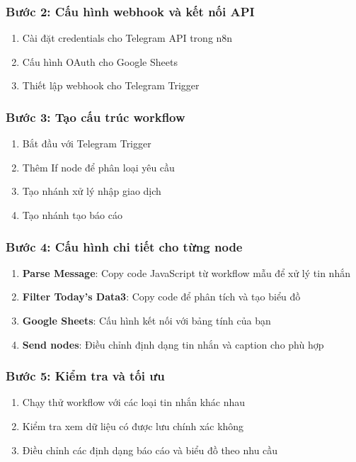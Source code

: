 \subsubsection{Bước 2: Cấu hình webhook và kết nối API}
\begin{enumerate}
    \item Cài đặt credentials cho Telegram API trong n8n
    \item Cấu hình OAuth cho Google Sheets
    \item Thiết lập webhook cho Telegram Trigger
\end{enumerate}

\subsubsection{Bước 3: Tạo cấu trúc workflow}
\begin{enumerate}
    \item Bắt đầu với Telegram Trigger
    \item Thêm If node để phân loại yêu cầu
    \item Tạo nhánh xử lý nhập giao dịch
    \item Tạo nhánh tạo báo cáo
\end{enumerate}

\subsubsection{Bước 4: Cấu hình chi tiết cho từng node}
\begin{enumerate}
    \item \textbf{Parse Message}: Copy code JavaScript từ workflow mẫu để xử lý tin nhắn
    \item \textbf{Filter Today's Data3}: Copy code để phân tích và tạo biểu đồ  
    \item \textbf{Google Sheets}: Cấu hình kết nối với bảng tính của bạn
    \item \textbf{Send nodes}: Điều chỉnh định dạng tin nhắn và caption cho phù hợp
\end{enumerate}

\subsubsection{Bước 5: Kiểm tra và tối ưu}
\begin{enumerate}
    \item Chạy thử workflow với các loại tin nhắn khác nhau
    \item Kiểm tra xem dữ liệu có được lưu chính xác không
    \item Điều chỉnh các định dạng báo cáo và biểu đồ theo nhu cầu
\end{enumerate}

